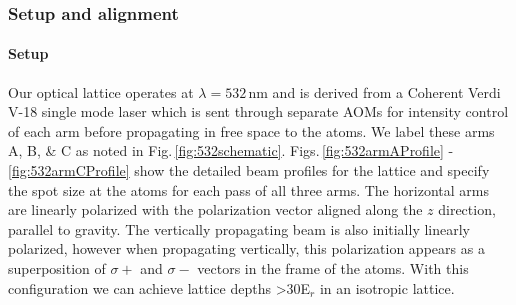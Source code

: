 \subsubsection{Setup and alignment} \label{sssec:532_align}
\paragraph{Setup}\label{ssec:lattice_setup}

Our optical lattice operates at $\lambda=532\,$nm and is derived from a Coherent Verdi V-18 single mode laser which is sent through separate AOMs for intensity control of each arm before propagating in free space to the atoms. 
We label these arms A, B, \& C as noted in Fig.\,\ref{fig:532schematic}.
Figs.\,\ref{fig:532armAProfile} - \ref{fig:532armCProfile} show the detailed beam profiles for the lattice and specify the spot size at the atoms for each pass of all three arms.
The horizontal arms are linearly polarized with the polarization vector aligned along the $z$ direction, parallel to gravity. 
The vertically propagating beam is also initially linearly polarized, however when propagating vertically, this polarization appears as a superposition of $\sigma+$ and $\sigma-$ vectors in the frame of the atoms.
With this configuration we can achieve lattice depths >$30$E$_r$ in an isotropic lattice. 

